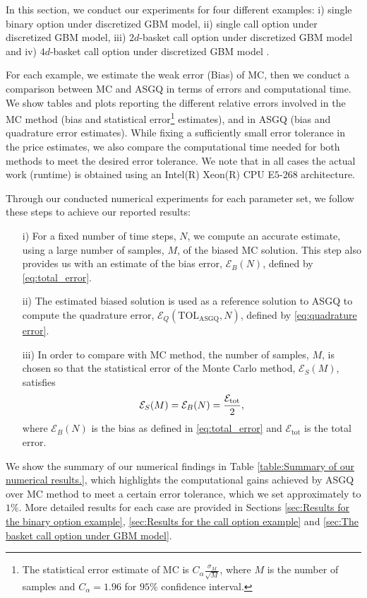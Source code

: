 In this section, we conduct our experiments for four different examples: i) single binary option under discretized GBM model, ii) single call option under discretized GBM model, iii) $2d$-basket call option under discretized GBM model and iv) $4d$-basket call option under discretized GBM model .

For each example, we estimate the weak error  (Bias) of MC, then we conduct a comparison between MC and ASGQ in terms of errors and computational time. We show tables and plots reporting  the different relative errors involved in the MC method (bias and statistical error\footnote{The statistical error estimate of MC is  $C_{\alpha} \frac{\sigma_M}{\sqrt{M}}$, where $M$ is the number of samples and $C_{\alpha}=1.96$ for $95\%$ confidence interval.}  estimates), and in ASGQ (bias and quadrature error estimates).  While fixing  a  sufficiently small error tolerance in the price estimates,  we also compare the computational time needed for both methods to meet the desired error tolerance.  We note that  in all cases the actual work (runtime) is obtained using an Intel(R) Xeon(R) CPU E$5$-$268$ architecture. 

Through our conducted numerical experiments for each parameter set, we follow these steps to achieve our reported results:
\begin{enumerate}
\item[i)] For a fixed number of time steps, $N$, we compute an accurate estimate, using a large number of samples, $M$, of the biased  MC solution. This step also provides us with an estimate of the bias error, $\mathcal{E}_B(N)$, defined by \eqref{eq:total_error}. 
\item[ii)] The estimated  biased solution is used as a reference solution  to ASGQ to compute the quadrature error, $\mathcal{E}_Q(\text{TOL}_{\text{ASGQ}},N)$, defined by \eqref{eq:quadrature error}.
\item[iii)] In order to compare with MC method, the number of samples, $M$, is chosen so that  the statistical error of the Monte Carlo  method, $\mathcal{E}_S(M)$, satisfies
\begin{align}\label{optimal_number_samples}
\mathcal{E}_S(M)= \mathcal{E}_B(N)=\frac{\mathcal{E}_{\text{tot}}}{2},
\end{align}
where $\mathcal{E}_B(N)$ is the bias as defined in \eqref{eq:total_error} and
$\mathcal{E}_{\text{tot}}$ is the total error. 
\end{enumerate}
We show  the summary of our numerical findings in Table \ref{table:Summary of our numerical results.}, which  highlights the computational gains achieved by ASGQ over MC method to meet a certain error tolerance, which we set approximately to $1\%$. More detailed results for each case  are provided in  Sections \ref{sec:Results for the binary option example}, \ref{sec:Results for the call option example} and \ref{sec:The basket call option  under GBM  model}.

